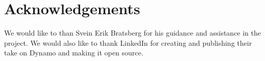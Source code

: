 
\section*{Acknowledgements}
We would like to than Svein Erik Bratsberg for his guidance and assistance in the project.
We would also like to thank LinkedIn for creating and publishing their take on Dynamo and making it open source.
